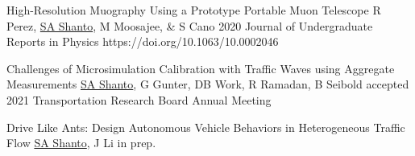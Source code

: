 
\begin{cvpublications}{}

    {High-Resolution Muography Using a Prototype Portable Muon Telescope}	
    {R Perez, \underline{SA Shanto}, M Moosajee, \& S Cano}
    {2020}
    {Journal of Undergraduate Reports in Physics}
    {https://doi.org/10.1063/10.0002046}

    {Challenges of Microsimulation Calibration with Traffic Waves using Aggregate Measurements}	
    {\underline{SA Shanto}, G Gunter, DB Work, R Ramadan, B Seibold}
    {accepted}
    {2021 Transportation Research Board Annual Meeting}
    {}

    {Drive Like Ants: Design Autonomous Vehicle Behaviors in Heterogeneous Traffic Flow}	
    {\underline{SA Shanto}, J Li}
    {in prep.}
    {}
    {}







\end{cvpublications}

